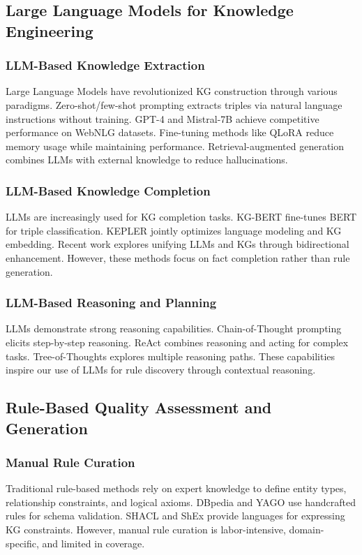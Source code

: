 \documentclass[runningheads]{llncs}
\begin{document}
\subsection{Large Language Models for Knowledge Engineering}

\subsubsection{LLM-Based Knowledge Extraction}
Large Language Models have revolutionized KG construction through various paradigms. Zero-shot/few-shot prompting \cite{ref_wei2023} extracts triples via natural language instructions without training. GPT-4 \cite{ref_openai2023} and Mistral-7B \cite{ref_jiang2023} achieve competitive performance on WebNLG datasets. Fine-tuning methods like QLoRA \cite{ref_dettmers2023} reduce memory usage while maintaining performance. Retrieval-augmented generation \cite{ref_lewis2020} combines LLMs with external knowledge to reduce hallucinations.

\subsubsection{LLM-Based Knowledge Completion}
LLMs are increasingly used for KG completion tasks. KG-BERT \cite{ref_yao2019} fine-tunes BERT for triple classification. KEPLER \cite{ref_wang2021kepler} jointly optimizes language modeling and KG embedding. Recent work \cite{ref_pan2024} explores unifying LLMs and KGs through bidirectional enhancement. However, these methods focus on fact completion rather than rule generation.

\subsubsection{LLM-Based Reasoning and Planning}
LLMs demonstrate strong reasoning capabilities. Chain-of-Thought prompting \cite{ref_wei2023} elicits step-by-step reasoning. ReAct \cite{ref_yao2023} combines reasoning and acting for complex tasks. Tree-of-Thoughts \cite{ref_yao2023tot} explores multiple reasoning paths. These capabilities inspire our use of LLMs for rule discovery through contextual reasoning.

\subsection{Rule-Based Quality Assessment and Generation}

\subsubsection{Manual Rule Curation}
Traditional rule-based methods rely on expert knowledge to define entity types, relationship constraints, and logical axioms. DBpedia \cite{ref_auer2007} and YAGO \cite{ref_suchanek2007} use handcrafted rules for schema validation. SHACL \cite{ref_knublauch2017} and ShEx \cite{ref_prud2014} provide languages for expressing KG constraints. However, manual rule curation is labor-intensive, domain-specific, and limited in coverage.
\end{document}
